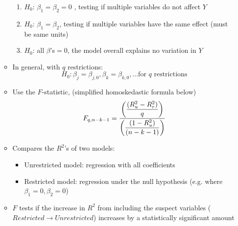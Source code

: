 \documentclass{article}
\begin{document}
\begin{itemize}
\begin{itemize}
\begin{enumerate}
			\item $H_0$: $\beta_1=\beta_2=0$	, testing if multiple variables do not affect $Y$
			\item $H_0$: $\beta_1=\beta_2$, testing if multiple variables have the same effect (must be same units)
			\item $H_0$: all $\beta$'s$=0$, the model overall explains no variation in $Y$
		\end{enumerate}
		\item In general, with $q$ restrictions:
		\begin{equation*}
		H_0: \beta_j=\beta_{j,0}, \beta_k=\beta_{k,0}, ...\text{for }q \text{ restrictions}	
		\end{equation*}
		\item Use the $F$-statistic, (simplified homoskedastic formula below)
		\begin{equation*}
	F_{q,n-k-1}=\cfrac{\bigg(\displaystyle\frac{(R^2_u-R^2_r)}{q}\bigg)}{\bigg(\displaystyle\frac{(1-R^2_u)}{(n-k-1)}\bigg)}
	\end{equation*}
		\item Compares the $R^2$'s of two models:
		\begin{itemize}
			\item Unrestricted model: regression with all coefficients
			\item Restricted model: regression under the null hypothesis (e.g. where $\beta_1=0, \beta_2=0$)
	\end{itemize}
	\item $F$ tests if the increase in $R^2$ from including the suspect variables ($Restricted \rightarrow Unrestricted$) increases by a statistically significant amount
\end{itemize}
\end{itemize}
\clearpage 
\end{document}
